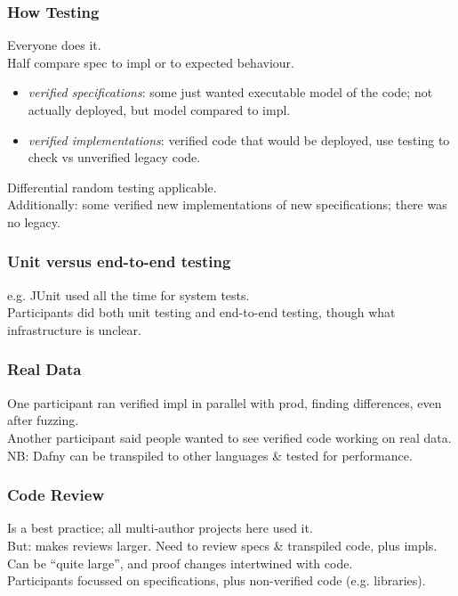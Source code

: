 \documentclass{beamer}
\newenvironment{changemargin}[1]{%
  \begin{list}{}{%
    \setlength{\topsep}{0pt}%
    \setlength{\leftmargin}{#1}%
    \setlength{\rightmargin}{1em}
    \setlength{\listparindent}{\parindent}%
    \setlength{\itemindent}{\parindent}%
    \setlength{\parsep}{\parskip}%
  }%
  \item[]}{\end{list}}
\begin{document}
\begin{frame}
  \frametitle{How Testing}
  \Large
  \begin{changemargin}{1cm}
    Everyone does it.\\
    Half compare spec to impl or to expected behaviour.\\
    \begin{itemize}
    \item \emph{verified specifications}: some just wanted executable model of the code; not actually deployed, but model compared to impl.
    \item \emph{verified implementations}: verified code that would be deployed, use testing to check vs unverified legacy code.
    \end{itemize}
    Differential random testing applicable.\\[1em]
    Additionally: some verified new implementations of new specifications; there was no legacy.
  \end{changemargin}
\end{frame}

\begin{frame}
  \frametitle{Unit versus end-to-end testing}
  \Large
  \begin{changemargin}{1cm}
    e.g. JUnit used all the time for system tests.\\[1em]
    Participants did both unit testing and end-to-end testing, though
    what infrastructure is unclear.\\[1em]
  \end{changemargin}
\end{frame}

\begin{frame}
  \frametitle{Real Data}
  \Large
  \begin{changemargin}{1cm}
    One participant ran verified impl in parallel with prod, finding differences, even after fuzzing.\\[1em]
    Another participant said people wanted to see verified code working on real data.\\[2em]
    NB: Dafny can be transpiled to other languages \& tested for performance.
  \end{changemargin}
\end{frame}

\begin{frame}
  \frametitle{Code Review}
  \Large
  \begin{changemargin}{1cm}
    Is a best practice; all multi-author projects here used it.\\[2em]
    But: makes reviews larger. Need to review specs \& transpiled code, plus impls.\\
    Can be ``quite large'', and proof changes intertwined with code.\\[1em]
    Participants focussed on specifications, plus non-verified code (e.g. libraries).\\[1em]
  \end{changemargin}
\end{frame}
\end{document}
